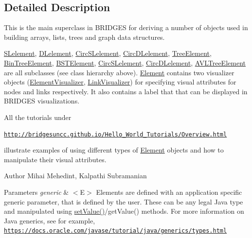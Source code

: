 \subsection{Detailed Description}
This is the main superclass in B\+R\+I\+D\+G\+ES for deriving a number of objects used in building arrays, lists, trees and graph data structures. 

\mbox{\hyperlink{classbridges_1_1base_1_1_s_lelement}{S\+Lelement}}, \mbox{\hyperlink{classbridges_1_1base_1_1_d_lelement}{D\+Lelement}}, \mbox{\hyperlink{classbridges_1_1base_1_1_circ_s_lelement}{Circ\+S\+Lelement}}, \mbox{\hyperlink{classbridges_1_1base_1_1_circ_d_lelement}{Circ\+D\+Lelement}}, \mbox{\hyperlink{classbridges_1_1base_1_1_tree_element}{Tree\+Element}}, \mbox{\hyperlink{classbridges_1_1base_1_1_bin_tree_element}{Bin\+Tree\+Element}}, \mbox{\hyperlink{classbridges_1_1base_1_1_b_s_t_element}{B\+S\+T\+Element}}, \mbox{\hyperlink{classbridges_1_1base_1_1_circ_s_lelement}{Circ\+S\+Lelement}}, \mbox{\hyperlink{classbridges_1_1base_1_1_circ_d_lelement}{Circ\+D\+Lelement}}, \mbox{\hyperlink{classbridges_1_1base_1_1_a_v_l_tree_element}{A\+V\+L\+Tree\+Element}} are all subclasses (see class hierarchy above). \mbox{\hyperlink{classbridges_1_1base_1_1_element}{Element}} contains two visualizer objects (\mbox{\hyperlink{classbridges_1_1base_1_1_element_visualizer}{Element\+Visualizer}}, \mbox{\hyperlink{classbridges_1_1base_1_1_link_visualizer}{Link\+Visualizer}}) for specifying visual attributes for nodes and links respectively. It also contains a label that that can be displayed in B\+R\+I\+D\+G\+ES visualizations.

All the tutorials under

\href{http://bridgesuncc.github.io/Hello_World_Tutorials/Overview.html}{\tt http\+://bridgesuncc.\+github.\+io/\+Hello\+\_\+\+World\+\_\+\+Tutorials/\+Overview.\+html}

illustrate examples of using different types of \mbox{\hyperlink{classbridges_1_1base_1_1_element}{Element}} objects and how to manipulate their visual attributes.

\begin{DoxyAuthor}{Author}
Mihai Mehedint, Kalpathi Subramanian
\end{DoxyAuthor}

\begin{DoxyParams}{Parameters}
{\em generic} & $<$\+E$>$ Elements are defined with an application specific generic parameter, that is defined by the user. These can be any legal Java type and manipulated using \mbox{\hyperlink{classbridges_1_1base_1_1_element_ab3cf1241da0bc4c59cea9d6f0fd7aaf4}{set\+Value()}}/get\+Value() methods. For more information on Java generics, see for example, \href{https://docs.oracle.com/javase/tutorial/java/generics/types.html}{\tt https\+://docs.\+oracle.\+com/javase/tutorial/java/generics/types.\+html} \\
\hline
\end{DoxyParams}


